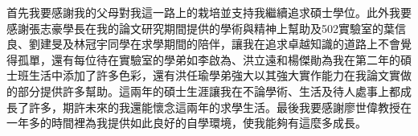 \setcounter{page}{1}
\begin{acknowledgementszh}
首先我要感謝我的父母對我這一路上的栽培並支持我繼續追求碩士學位。此外我要感謝張志豪學長在我的論文研究期間提供的學術與精神上幫助及502實驗室的葉信良、劉建旻及林冠宇同學在求學期間的陪伴，讓我在追求卓越知識的道路上不會覺得孤單，還有每位待在實驗室的學弟如李啟為、洪立遠和楊傑勛為我在第二年的碩士班生活中添加了許多色彩，還有洪任瑜學弟強大以其強大實作能力在我論文實做的部分提供許多幫助。這兩年的碩士生涯讓我在不論學術、生活及待人處事上都成長了許多，期許未來的我還能懷念這兩年的求學生活。最後我要感謝廖世偉教授在一年多的時間裡為我提供如此良好的自學環境，使我能夠有這麼多成長。
\end{acknowledgementszh}